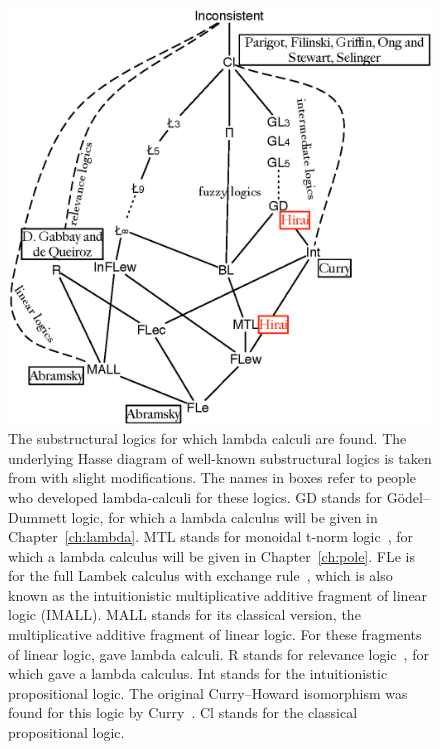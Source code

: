  \begin{figure}
  \centering
  \includegraphics{lattice.eps}
  \caption[The substructural logics with lambda calculi.]
  {The substructural logics for which lambda calculi are found.
  The underlying Hasse diagram of well-known substructural logics is
  taken from
  \cite[p.~120]{residuated} with slight modifications.
  The names in boxes refer to people who developed lambda-calculi for
  these logics.
  \textsf{GD} stands for G\"odel--Dummett logic, for which
  a lambda calculus will be given in
  Chapter~\ref{ch:lambda}.
  \textsf{MTL} stands for monoidal t-norm logic~\citep{Esteva2001271},
  for which a lambda calculus will be given
  in Chapter~\ref{ch:pole}.
  \textsf{FLe} is for the full Lambek calculus with exchange
  rule~\citep[p.86]{residuated}, which is also known as the
  intuitionistic
  multiplicative additive fragment of linear logic (IMALL).
  \textsf{MALL} stands for its classical version, the multiplicative
  additive fragment of linear logic.  For these fragments of linear
  logic,
  \citet{abramsky1993computational} gave lambda calculi.
  \textsf{R} stands for relevance logic~\citep{urquhart1972},
  for which \citet{gabbay1992} gave a lambda calculus.
  \textsf{Int} stands for the intuitionistic propositional logic.
  The original Curry--Howard isomorphism was found for this logic by
  Curry~\citep{curry1942}.
  \textsf{Cl} stands for the classical propositional logic.
}
\end{figure}
